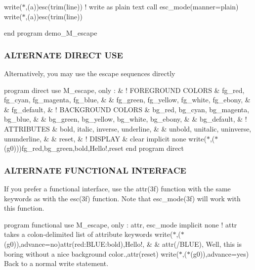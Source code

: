 write($\ast$,\textquotesingle{}(a)\textquotesingle{})esc(trim(line)) ! write as plain text call esc\+\_\+mode(manner=\textquotesingle{}plain\textquotesingle{}) write($\ast$,\textquotesingle{}(a)\textquotesingle{})esc(trim(line))

end program demo\+\_\+\+M\+\_\+escape

\subsubsection*{A\+L\+T\+E\+R\+N\+A\+TE D\+I\+R\+E\+CT U\+SE}

Alternatively, you may use the escape sequences directly

program direct use M\+\_\+escape, only \+: \& ! F\+O\+R\+E\+G\+R\+O\+U\+ND C\+O\+L\+O\+RS \& fg\+\_\+red, fg\+\_\+cyan, fg\+\_\+magenta, fg\+\_\+blue, \& \& fg\+\_\+green, fg\+\_\+yellow, fg\+\_\+white, fg\+\_\+ebony, \& \& fg\+\_\+default, \& ! B\+A\+C\+K\+G\+R\+O\+U\+ND C\+O\+L\+O\+RS \& bg\+\_\+red, bg\+\_\+cyan, bg\+\_\+magenta, bg\+\_\+blue, \& \& bg\+\_\+green, bg\+\_\+yellow, bg\+\_\+white, bg\+\_\+ebony, \& \& bg\+\_\+default, \& ! A\+T\+T\+R\+I\+B\+U\+T\+ES \& bold, italic, inverse, underline, \& \& unbold, unitalic, uninverse, ununderline, \& \& reset, \& ! D\+I\+S\+P\+L\+AY \& clear implicit none write($\ast$,\textquotesingle{}($\ast$(g0))\textquotesingle{})fg\+\_\+red,bg\+\_\+green,bold,\textquotesingle{}Hello!\textquotesingle{},reset end program direct

\subsubsection*{A\+L\+T\+E\+R\+N\+A\+TE F\+U\+N\+C\+T\+I\+O\+N\+AL I\+N\+T\+E\+R\+F\+A\+CE}

If you prefer a functional interface, use the attr(3f) function with the same keywords as with the esc(3f) function. Note that esc\+\_\+mode(3f) will work with this function.

program functional use M\+\_\+escape, only \+: attr, esc\+\_\+mode implicit none ! attr takes a colon-\/delimited list of attribute keywords write($\ast$,\textquotesingle{}($\ast$(g0))\textquotesingle{},advance=\textquotesingle{}no\textquotesingle{})attr(\textquotesingle{}red\+:\+B\+L\+UE\+:bold\textquotesingle{}),\textquotesingle{}Hello!\textquotesingle{}, \& \& attr(\textquotesingle{}/\+B\+L\+UE\textquotesingle{}),\textquotesingle{} Well, this is boring without a nice background color.\textquotesingle{},attr(\textquotesingle{}reset\textquotesingle{}) write($\ast$,\textquotesingle{}($\ast$(g0))\textquotesingle{},advance=\textquotesingle{}yes\textquotesingle{})\textquotesingle{} Back to a normal write statement.\textquotesingle{}

